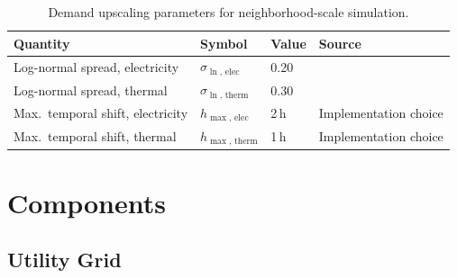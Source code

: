 \documentclass[12pt,a4paper]{report}
\begin{document}
\begin{table}[H]
\centering
\caption{Demand upscaling parameters for neighborhood-scale simulation.}
\label{tab:upscaling_params}
\begin{tabular}{llll}
\hline
\textbf{Quantity} & \textbf{Symbol} & \textbf{Value} & \textbf{Source} \\
\hline
Log-normal spread, electricity
    & $\sigma_{\ln,\,\mathrm{elec}}$
    & 0.20
    & \cite{vtt2015lognormal,vtt2018hierarchical} \\
Log-normal spread, thermal
    & $\sigma_{\ln,\,\mathrm{therm}}$
    & 0.30
    & \cite{vandenbrom2019variances} \\
Max.\ temporal shift, electricity
    & $h_{\max,\,\mathrm{elec}}$
    & 2\,h
    & Implementation choice \\
Max.\ temporal shift, thermal
    & $h_{\max,\,\mathrm{therm}}$
    & 1\,h
    & Implementation choice \\
\hline
\end{tabular}
\end{table}


\section{Components}
\label{sec:components}


\subsection{Utility Grid}
\label{subsec:utility_grid}
\end{document}
